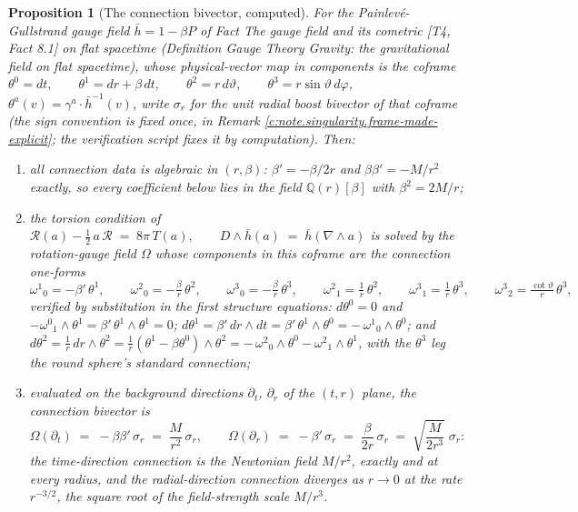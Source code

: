 \documentclass[11pt]{article}
\newtheorem{proposition}[theorem]{Proposition}
\theoremstyle{definition}
\theoremstyle{plain}
\newcommand{\changedmark}[2]{\marginpar{\raggedright\scriptsize\color{#1}#2}}
\providecommand{\hb}{}\renewcommand{\hb}{\bar{h}}
\begin{document}
\begin{proposition}[The connection bivector, computed]\label{c:singularity.connection-bivector-computed}
\changedmark{gray}{reworded}
For the Painlev\'e-Gullstrand gauge field $\hb = 1 - \beta P$ of Fact \emph{The gauge field and its cometric} [T4, Fact 8.1] on flat spacetime (Definition \emph{Gauge Theory Gravity: the gravitational field on flat spacetime}), whose physical-vector map in components is the coframe $\theta^0 = dt, \qquad \theta^1 = dr + \beta\,dt, \qquad \theta^2 = r\,d\vartheta, \qquad \theta^3 = r\sin\vartheta\,d\varphi$, $\theta^a(v) = \gamma^a \cdot \hb^{-1}(v)$, write $\sigma_r$ for the unit radial boost bivector of that coframe (the sign convention is fixed once, in Remark \ref{c:note.singularity.frame-made-explicit}; the verification script fixes it by computation). Then:
\begin{enumerate}
\item all connection data is algebraic in $(r, \beta)$: $\beta' = -\beta/2r$ and $\beta\beta' = -M/r^2$ exactly, so every coefficient below lies in the field $\mathbb{Q}(r)[\beta]$ with $\beta^2 = 2M/r$;
\item the torsion condition of $\mathcal{R}(a) - \tfrac12\, a\, \mathcal{R} \;=\; 8\pi\, T(a), \qquad D \wedge \hb(a) \;=\; \hb(\nabla \wedge a)$ is solved by the rotation-gauge field $\Omega$ whose components in this coframe are the connection one-forms
\[
\omega^1{}_0 = -\beta'\,\theta^1, \qquad
\omega^2{}_0 = -\tfrac{\beta}{r}\,\theta^2, \qquad
\omega^3{}_0 = -\tfrac{\beta}{r}\,\theta^3, \qquad
\omega^2{}_1 = \tfrac{1}{r}\,\theta^2, \qquad
\omega^3{}_1 = \tfrac{1}{r}\,\theta^3, \qquad
\omega^3{}_2 = \tfrac{\cot\vartheta}{r}\,\theta^3,
\]
verified by substitution in the first structure equations: $d\theta^0 = 0$ and $-\omega^0{}_1 \wedge \theta^1 = \beta'\,\theta^1 \wedge \theta^1 = 0$; $d\theta^1 = \beta'\,dr\wedge dt = \beta'\,\theta^1\wedge\theta^0 = -\,\omega^1{}_0\wedge\theta^0$; and $d\theta^2 = \tfrac1r\,dr\wedge\theta^2 = \tfrac1r(\theta^1 - \beta\theta^0)\wedge\theta^2 = -\,\omega^2{}_0\wedge\theta^0 - \omega^2{}_1\wedge\theta^1$, with the $\theta^3$ leg the round sphere's standard connection;
\item evaluated on the background directions $\partial_t$, $\partial_r$ of the $(t,r)$ plane, the connection bivector is
\[
\Omega(\partial_t) \;=\; -\beta\beta'\,\sigma_r \;=\; \frac{M}{r^2}\,\sigma_r ,
\qquad
\Omega(\partial_r) \;=\; -\beta'\,\sigma_r \;=\; \frac{\beta}{2r}\,\sigma_r \;=\; \sqrt{\frac{M}{2r^3}}\;\sigma_r :
\]
the time-direction connection is the Newtonian field $M/r^2$, exactly and at every radius, and the radial-direction connection diverges as $r \to 0$ at the rate $r^{-3/2}$, the square root of the field-strength scale $M/r^3$.
\end{enumerate}
\end{proposition}
\end{document}
